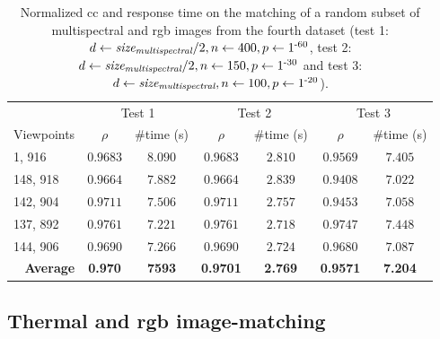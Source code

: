 \renewcommand{\arraystretch}{1.2}
\begin{table}
    \small
    \caption{Normalized \acrshort{cc} and response time on the matching of a random subset of multispectral and \acrshort{rgb} images from the fourth dataset (test 1: $d \gets \textit{size}_{\textit{multispectral}} / 2, n \gets 400, p \gets 1\textsuperscript{-60}$, test 2: $d \gets \textit{size}_{\textit{multispectral}} / 2, n \gets 150, p \gets 1\textsuperscript{-30}$ and test 3: $d \gets \textit{size}_{\textit{multispectral}}, n \gets 100, p \gets 1\textsuperscript{-20}$).}
    \label{table:multispectral_rgb_correlation}
    \begin{tabular}{l|cc|cc|cc}
        \toprule
        \multicolumn{1}{c}{} & \multicolumn{2}{c}{Test 1} & \multicolumn{2}{c}{Test 2} & \multicolumn{2}{c}{Test 3}\\
        \cmidrule{1-7}
        Viewpoints & $\rho$ & \#time (\si{\second}) & $\rho$ & \#time (\si{\second}) & $\rho$ & \#time (\si{\second})\\
        \cmidrule{1-7}
        1, 916 & $0.9683$ & $8.090$ & $0.9683$ & $2.810$ & $0.9569$ & $7.405$\\
        148, 918 & $0.9664$ & $7.882$ & $0.9664$ & $2.839$ & $0.9408$ & $7.022$\\
        142, 904 & $0.9711$ & $7.506$ & $0.9711$ & $2.757$ & $0.9453$ & $7.058$\\ 
        137, 892 & $0.9761$ & $7.221$ & $0.9761$ & $2.718$ & $0.9747$ & $7.448$\\
        144, 906 & $0.9690$ & $7.266$ & $0.9690$ & $2.724$ & $0.9680$ & $7.087$\\
        \cmidrule{1-7}
        \multicolumn{1}{r|}{\textbf{Average}} & \textbf{0.970} & \textbf{7593} & \textbf{0.9701} & \textbf{2.769} & \textbf{0.9571} & \textbf{7.204}\\
        \bottomrule
    \end{tabular}
    \normalsize
\end{table}
\renewcommand{\arraystretch}{1}

\subsection{Thermal and \acrshort{rgb} image-matching}

